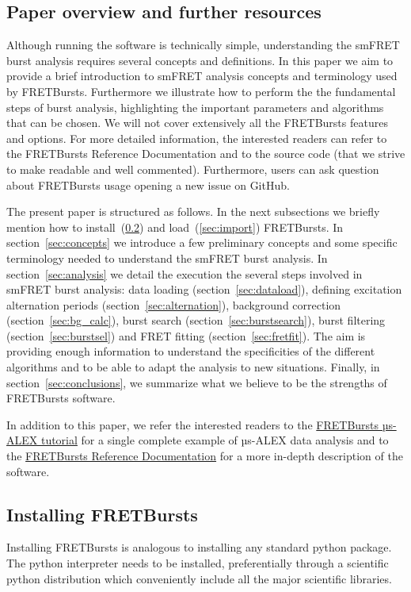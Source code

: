 \subsection{Paper overview and further resources}

Although running the software is technically simple, understanding the smFRET 
burst analysis requires several concepts and definitions.
In this paper we aim to provide a brief introduction to smFRET analysis concepts
and terminology used by FRETBursts. Furthermore we illustrate how to perform the
the fundamental steps of burst analysis, highlighting the important parameters
and algorithms that can be chosen. We will not cover extensively all the FRETBursts
features and options. For more detailed information, the interested readers can refer 
to the FRETBursts Reference Documentation and to the source code (that we strive 
to make readable and well commented). 
Furthermore, users can ask question about FRETBursts usage opening a new issue on GitHub.

The present paper is structured as follows. 
In the next subsections we briefly mention how to install~(\ref{sec:install}) and 
load~(\ref{sec:import}) FRETBursts.
In section~\ref{sec:concepts} we
introduce a few preliminary concepts and some specific terminology needed 
to understand the smFRET burst analysis. 
In section~\ref{sec:analysis} we detail the execution the several steps involved
in smFRET burst analysis: data loading (section~\ref{sec:dataload}), defining 
excitation alternation periods (section~\ref{sec:alternation}), background 
correction (section~\ref{sec:bg_calc}), burst search (section~\ref{sec:burstsearch}), 
burst filtering (section~\ref{sec:burstsel}) and FRET fitting (section~\ref{sec:fretfit}).
The aim is providing enough information to understand the specificities of 
the different algorithms and to be able to adapt the analysis to new situations.
Finally, in section~\ref{sec:conclusions}, we summarize what we believe to be
the strengths of FRETBursts software.

In addition to this paper, we refer the interested readers to the 
\href{http://nbviewer.ipython.org/github/tritemio/FRETBursts_notebooks/blob/master/notebooks/FRETBursts\%20-\%20us-ALEX\%20smFRET\%20burst\%20analysis.ipynb}{FRETBursts µs-ALEX tutorial} 
for a single complete example of µs-ALEX data analysis and to the
\href{http://fretbursts.readthedocs.org/}{FRETBursts Reference Documentation}
for a more in-depth description of the software.

\subsection{Installing FRETBursts}
\label{sec:install}
Installing FRETBursts is analogous to installing any standard python
package. The python interpreter needs to be installed, preferentially
through a scientific python distribution which conveniently include 
all the major scientific libraries.

